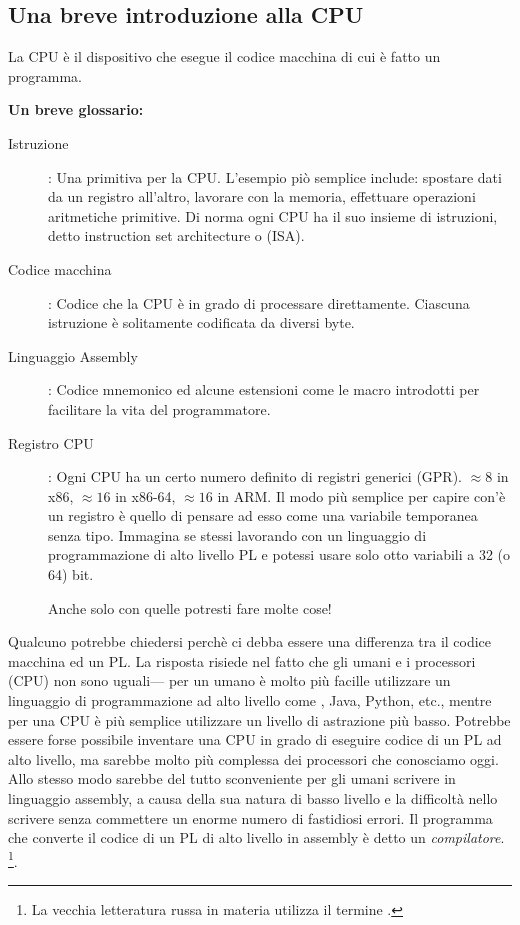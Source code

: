 \subsection{Una breve introduzione alla CPU}

La \ac{CPU} è il dispositivo che esegue il codice macchina di cui è fatto un programma.

\textbf{Un breve glossario:}

\begin{description}
\item[Istruzione]: Una primitiva per la \ac{CPU}.
L'esempio piò semplice include: spostare dati da un registro all'altro, lavorare con la memoria, effettuare operazioni aritmetiche primitive.
Di norma ogni \ac{CPU} ha il suo insieme di istruzioni, detto instruction set architecture o (\ac{ISA}).

\item[Codice macchina]: Codice che la \ac{CPU} è in grado di processare direttamente.
Ciascuna istruzione è solitamente codificata da diversi byte.
\item[Linguaggio Assembly]: Codice mnemonico ed alcune estensioni come le macro introdotti per facilitare la vita del programmatore.
\item[Registro CPU]: Ogni \ac{CPU} ha un certo numero definito di registri generici (\ac{GPR}).
$\approx 8$ in x86, $\approx 16$ in x86-64, $\approx 16$ in ARM.
Il modo più semplice per capire con'è un registro è quello di pensare ad esso come una variabile temporanea senza tipo.
Immagina se stessi lavorando con un linguaggio di programmazione di alto livello \ac{PL} e potessi usare solo otto variabili a 32 (o 64) bit.

Anche solo con quelle potresti fare molte cose!
\end{description}


Qualcuno potrebbe chiedersi perchè ci debba essere una differenza tra il codice macchina ed un \ac{PL}. La risposta risiede nel fatto che gli umani e i processori (\ac{CPU}) non sono uguali---%
per un umano è molto più facille utilizzare un linguaggio di programmazione ad alto livello come \CCpp, Java, Python, etc., mentre per una \ac{CPU} è più semplice utilizzare un livello di astrazione più basso.
Potrebbe essere forse possibile inventare una \ac{CPU} in grado di eseguire codice di un \ac{PL} ad alto livello, ma sarebbe molto più complessa dei processori che conosciamo oggi.
Allo stesso modo sarebbe del tutto sconveniente per gli umani scrivere in linguaggio assembly, a causa della sua natura di basso livello e la difficoltà nello scrivere senza commettere un enorme numero di fastidiosi errori.
Il programma che converte il codice di un \ac{PL} di alto livello in assembly è detto un \emph{compilatore}.
\footnote{La vecchia letteratura russa in materia utilizza il termine .}.

